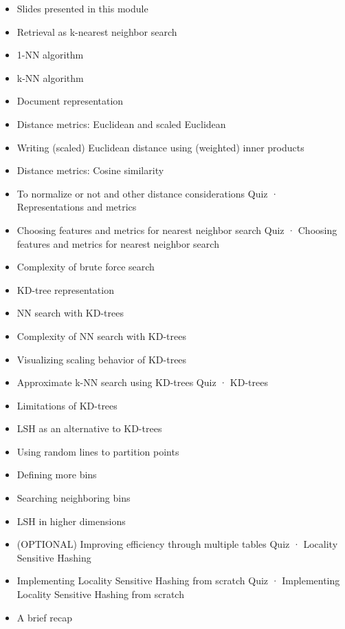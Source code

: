\begin{itemize}
\item Slides presented in this module
\item Retrieval as k-nearest neighbor search
\item 1-NN algorithm
\item k-NN algorithm
\item Document representation
\item Distance metrics: Euclidean and scaled Euclidean
\item Writing (scaled) Euclidean distance using (weighted) inner products
\item Distance metrics: Cosine similarity
\item To normalize or not and other distance considerations
Quiz · Representations and metrics
\item Choosing features and metrics for nearest neighbor search
Quiz · Choosing features and metrics for nearest neighbor search
\item Complexity of brute force search
\item KD-tree representation
\item NN search with KD-trees
\item Complexity of NN search with KD-trees
\item Visualizing scaling behavior of KD-trees
\item Approximate k-NN search using KD-trees
Quiz · KD-trees
\item Limitations of KD-trees
\item LSH as an alternative to KD-trees
\item Using random lines to partition points
\item Defining more bins
\item Searching neighboring bins
\item LSH in higher dimensions
\item (OPTIONAL) Improving efficiency through multiple tables
Quiz · Locality Sensitive Hashing
\item Implementing Locality Sensitive Hashing from scratch
Quiz · Implementing Locality Sensitive Hashing from scratch
\item A brief recap
\end{itemize}
